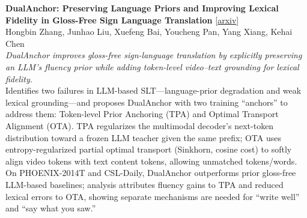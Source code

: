\documentclass[12pt,letterpaper]{article}
\begin{document}
\medskip

{\small\textbf{DualAnchor: Preserving Language Priors and Improving Lexical Fidelity in Gloss-Free Sign Language Translation}} {\scriptsize[\href{https://arxiv.org/abs/2607.27614}{arxiv}]}\\
{\scriptsize Hongbin Zhang, Junhao Liu, Xuefeng Bai, Youcheng Pan, Yang Xiang, Kehai Chen}\\

{\small\textit{DualAnchor improves gloss-free sign-language translation by explicitly preserving an LLM's fluency prior while adding token-level video--text grounding for lexical fidelity.}}\\[1pt]
{\footnotesize Identifies two failures in LLM-based SLT---language-prior degradation and weak lexical grounding---and proposes DualAnchor with two training ``anchors'' to address them: Token-level Prior Anchoring (TPA) and Optimal Transport Alignment (OTA). TPA regularizes the multimodal decoder's next-token distribution toward a frozen LLM teacher given the same prefix; OTA uses entropy-regularized partial optimal transport (Sinkhorn, cosine cost) to softly align video tokens with text content tokens, allowing unmatched tokens/words. On PHOENIX-2014T and CSL-Daily, DualAnchor outperforms prior gloss-free LLM-based baselines; analysis attributes fluency gains to TPA and reduced lexical errors to OTA, showing separate mechanisms are needed for ``write well'' and ``say what you saw.''}

\medskip
\end{document}
